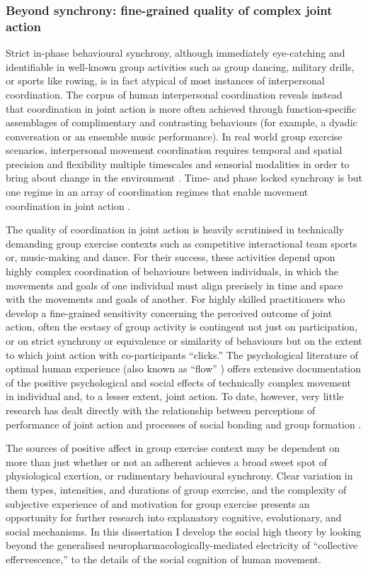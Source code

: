 \begin{CJK}{UTF8}{gbsn}
\subsubsection{Beyond synchrony: fine-grained quality of complex joint action}

Strict in-phase behavioural synchrony, although immediately eye-catching and identifiable in well-known group activities such as group dancing, military drills, or sports like rowing, is in fact atypical of most instances of interpersonal coordination.  The corpus of human interpersonal coordination reveals instead that coordination in joint action is more often achieved through function-specific assemblages of complimentary and contrasting behaviours (for example, a dyadic conversation or an ensemble music performance).  In real world group exercise scenarios, interpersonal movement coordination requires temporal and spatial precision and flexibility multiple timescales and sensorial modalities in order to bring about change in the environment \citep{Sebanz2006}.  Time- and phase locked synchrony is but one regime in an array of coordination regimes that enable movement coordination in joint action \citep{Kelso2013}.

The quality of coordination in joint action is heavily scrutinised in technically demanding group exercise contexts such as competitive interactional team sports or, music-making and dance.  For their success, these activities depend upon highly complex coordination of behaviours between individuals, in which the movements and goals of one individual must align precisely in time and space with the movements and goals of another.  For highly skilled practitioners who develop a fine-grained sensitivity concerning the perceived outcome of joint action, often the ecstasy of group activity is contingent not just on participation, or on strict synchrony or equivalence or similarity of behaviours but on the extent to which joint action with co-participants ``clicks.''  The psychological literature of optimal human experience (also known as ``flow'' \citep{Csikszentmihalyi1992}) offers extensive documentation of the positive psychological and social effects of technically complex movement in individual and, to a lesser extent, joint action. To date, however, very little research has dealt directly with the relationship between perceptions of performance of joint action and processes of social bonding and group formation \citep[but see][]{Marsh2009}.

The sources of positive affect in group exercise context may be dependent on more than just whether or not an adherent achieves a broad sweet spot of physiological exertion, or rudimentary behavioural synchrony. Clear variation in them types, intensities, and durations of group exercise, and the complexity of subjective experience of and motivation for group exercise presents an opportunity for further research into explanatory cognitive, evolutionary, and social mechanisms.   In this dissertation I develop the social high theory by looking beyond the generalised neuropharmacologically-mediated electricity of ``collective effervescence,'' to the details of the social cognition of human movement.



\end{CJK}
